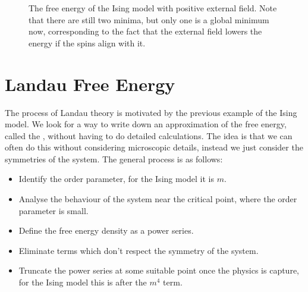 \documentclass[fleqn]{NotesClass}
\begin{document}
    \begin{figure}
        \caption[Free energy of the Ising model with positive external field.]{The free energy of the Ising model with positive external field. Note that there are still two minima, but only one is a global minimum now, corresponding to the fact that the external field lowers the energy if the spins align with it.}
        \label{fig:landau free energy positive external field}
    \end{figure}
    
    \section{Landau Free Energy}
    The process of Landau theory is motivated by the previous example of the Ising model.
    We look for a way to write down an approximation of the free energy, called the , without having to do detailed calculations.
    The idea is that we can often do this without considering microscopic details, instead we just consider the symmetries of the system.
    The general process is as follows:
    \begin{itemize}
        \item Identify the order parameter, for the Ising model it is \(m\).
        \item Analyse the behaviour of the system near the critical point, where the order parameter is small.
        \item Define the free energy density as a power series.
        \item Eliminate terms which don't respect the symmetry of the system.
        \item Truncate the power series at some suitable point once the physics is capture, for the Ising model this is after the \(m^4\) term.
    \end{itemize}
    
\end{document}
